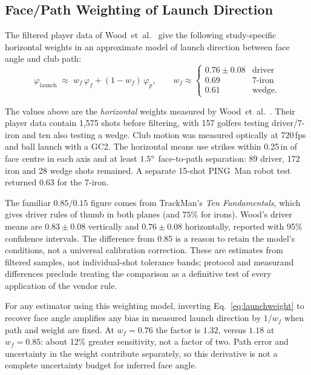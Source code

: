 \subsection{Face/Path Weighting of Launch Direction}
\label{sec:facepathweighting}

The filtered player data of Wood~et~al.~\cite{facepathstudy} give the
following study-specific horizontal weights in an approximate model of
launch direction between face angle and club path:
\begin{equation}
\label{eq:launchweight}
\varphi_{\mathrm{launch}} \;\approx\;
  w_f\,\varphi_f + (1-w_f)\,\varphi_p,
\qquad
w_f \approx
\begin{cases}
  0.76 \pm 0.08 & \text{driver} \\
  0.69 & \text{7-iron} \\
  0.61 & \text{wedge.}
\end{cases}
\end{equation}

\begin{warning}
The values above are the \emph{horizontal} weights measured by
Wood~et~al.~\cite{facepathstudy}. Their player data contain 1{,}575 shots
before filtering, with 157 golfers testing driver/7-iron and ten also
testing a wedge. Club motion was measured optically at 720\,fps and ball
launch with a GC2. The horizontal means use strikes within 0.25\,in of
face centre in each axis and at least $1.5\si{\degree}$ face-to-path separation:
89 driver, 172 iron and 28 wedge shots remained. A separate 15-shot PING~Man
robot test returned $0.63$ for the 7-iron.

The familiar $0.85/0.15$ figure comes from TrackMan's \emph{Ten
Fundamentals}, which gives driver rules of thumb in both planes (and
$75\%$ for irons). Wood's driver means are $0.83 \pm 0.08$ vertically
and $0.76 \pm 0.08$ horizontally, reported with 95\% confidence intervals.
The difference from 0.85 is a reason to retain the model's conditions,
not a universal calibration correction. These are estimates from filtered
samples, not individual-shot tolerance bands; protocol and measurand
differences preclude treating the comparison as a definitive test of every
application of the vendor rule.

For any estimator using this weighting model, inverting
Eq.~\eqref{eq:launchweight} to recover face angle amplifies any bias in
measured launch direction by $1/w_f$ when path and weight are fixed.
At $w_f=0.76$ the factor is $1.32$, versus $1.18$ at $w_f=0.85$:
about 12\% greater sensitivity, not a factor of two. Path error and
uncertainty in the weight contribute separately, so this derivative is
not a complete uncertainty budget for inferred face angle.
\end{warning}

